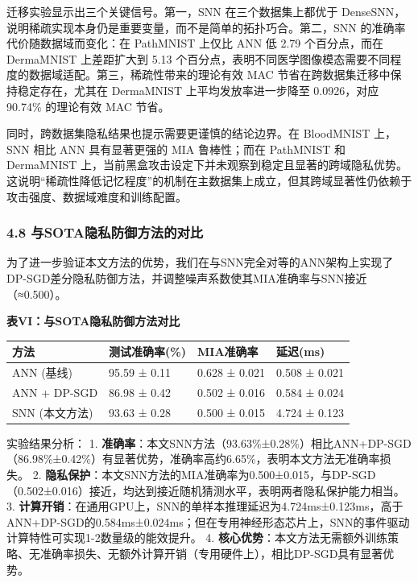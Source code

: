 \documentclass[
]{article}
\begin{document}
迁移实验显示出三个关键信号。第一，SNN 在三个数据集上都优于
DenseSNN，说明稀疏实现本身仍是重要变量，而不是简单的拓扑巧合。第二，SNN
的准确率代价随数据域而变化：在 PathMNIST 上仅比 ANN 低 2.79
个百分点，而在 DermaMNIST 上差距扩大到 5.13
个百分点，表明不同医学图像模态需要不同程度的数据域适配。第三，稀疏性带来的理论有效
MAC 节省在跨数据集迁移中保持稳定存在，尤其在 DermaMNIST
上平均发放率进一步降至 0.0926，对应 90.74\% 的理论有效 MAC 节省。

同时，跨数据集隐私结果也提示需要更谨慎的结论边界。在 BloodMNIST 上，SNN
相比 ANN 具有显著更强的 MIA 鲁棒性；而在 PathMNIST 和 DermaMNIST
上，当前黑盒攻击设定下并未观察到稳定且显著的跨域隐私优势。这说明``稀疏性降低记忆程度''的机制在主数据集上成立，但其跨域显著性仍依赖于攻击强度、数据域难度和训练配置。

\subsubsection{4.8
与SOTA隐私防御方法的对比}\label{ux4e0esotaux9690ux79c1ux9632ux5fa1ux65b9ux6cd5ux7684ux5bf9ux6bd4}

为了进一步验证本文方法的优势，我们在与SNN完全对等的ANN架构上实现了DP-SGD差分隐私防御方法，并调整噪声系数使其MIA准确率与SNN接近（≈0.500）。

\textbf{表VI：与SOTA隐私防御方法对比}

\begin{longtable}[]{@{}llll@{}}
\toprule\noalign{}
方法 & 测试准确率(\%) & MIA准确率 & 延迟(ms) \\
\midrule\noalign{}
\endhead
\bottomrule\noalign{}
\endlastfoot
ANN (基线) & 95.59 ± 0.11 & 0.628 ± 0.021 & 0.508 ± 0.021 \\
ANN + DP-SGD & 86.98 ± 0.42 & 0.502 ± 0.016 & 0.584 ± 0.024 \\
SNN (本文方法) & 93.63 ± 0.28 & 0.500 ± 0.015 & 4.724 ± 0.123 \\
\end{longtable}

实验结果分析： 1.
\textbf{准确率}：本文SNN方法（93.63\%±0.28\%）相比ANN+DP-SGD（86.98\%±0.42\%）有显著优势，准确率高约6.65\%，表明本文方法无准确率损失。
2.
\textbf{隐私保护}：本文SNN方法的MIA准确率为0.500±0.015，与DP-SGD（0.502±0.016）接近，均达到接近随机猜测水平，表明两者隐私保护能力相当。
3.
\textbf{计算开销}：在通用GPU上，SNN的单样本推理延迟为4.724ms±0.123ms，高于ANN+DP-SGD的0.584ms±0.024ms；但在专用神经形态芯片上，SNN的事件驱动计算特性可实现1-2数量级的能效提升。
4.
\textbf{核心优势}：本文方法无需额外训练策略、无准确率损失、无额外计算开销（专用硬件上），相比DP-SGD具有显著优势。
\end{document}
